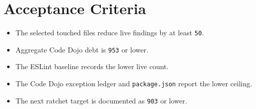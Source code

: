 \section{Acceptance Criteria}\label{record-236-acceptance-criteria}

\begin{itemize}
\tightlist
\item
  The selected touched files reduce live findings by at least \texttt{5\allowbreak{}0}.
\item
  Aggregate Code Dojo debt is \texttt{9\allowbreak{}5\allowbreak{}3} or lower.
\item
  The ESLint baseline records the lower live count.
\item
  The Code Dojo exception ledger and \texttt{p\allowbreak{}a\allowbreak{}c\allowbreak{}k\allowbreak{}a\allowbreak{}g\allowbreak{}e\allowbreak{}.\allowbreak{}j\allowbreak{}s\allowbreak{}o\allowbreak{}n} report the lower ceiling.
\item
  The next ratchet target is documented as \texttt{9\allowbreak{}0\allowbreak{}3} or lower.
\end{itemize}

